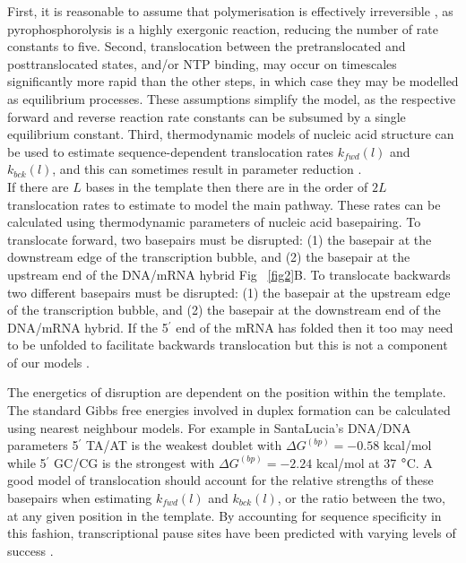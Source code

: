\documentclass[10pt,letterpaper]{article}
\begin{document}
First, it is reasonable to assume that polymerisation is effectively irreversible  \cite{erie1992single, rhodes1974ribonucleic, maoileidigh2011unified, bai2004sequence}, as pyrophosphorolysis is a highly exergonic reaction, reducing the number of rate constants to five. 
Second, translocation between the pretranslocated and posttranslocated states, and/or NTP binding, may occur on timescales significantly more rapid than the other steps, in which case they may be modelled as equilibrium processes. These assumptions simplify the model, as the respective forward and reverse reaction rate constants can be subsumed by a single equilibrium constant. Third, thermodynamic models of nucleic acid structure can be used to estimate sequence-dependent translocation rates $k_{fwd}(l)$ and $k_{bck}(l)$, and this can sometimes result in parameter reduction \cite{tadigotla2006thermodynamic, maoileidigh2011unified, bai2004sequence}. \\


If there are $L$ bases in the template then there are in the order of $2L$ translocation rates to estimate to model the main pathway. These rates can be calculated using thermodynamic parameters of nucleic acid basepairing. To translocate forward, two basepairs must be disrupted: (1) the basepair at the downstream edge of the transcription bubble, and (2) the basepair at the upstream end of the DNA/mRNA hybrid Fig ~\ref{fig2}B. To translocate backwards two different basepairs must be disrupted: (1) the basepair at the upstream edge of the transcription bubble, and (2) the basepair at the downstream end of the DNA/mRNA hybrid. If the 5$^\prime$ end of the mRNA has folded then it too may need to be unfolded to facilitate backwards translocation but this is not a component of our models \cite{tadigotla2006thermodynamic, maoileidigh2011unified}. \par

The energetics of disruption are dependent on the position within the template. The standard Gibbs free energies involved in duplex formation can be calculated using nearest neighbour models. For example in SantaLucia's DNA/DNA parameters \cite{santalucia1998unified} 5$^\prime$ TA/AT is the weakest doublet with $\Delta G^{(bp)} = -0.58$ kcal/mol while 5$^\prime$ GC/CG is the strongest with $\Delta G^{(bp)} = -2.24$ kcal/mol at 37 $\degree$C. A good model of translocation should account for the relative strengths of these basepairs when estimating $k_{fwd}(l)$ and $k_{bck}(l)$, or the ratio between the two, at any given position in the template. By accounting for sequence specificity in this fashion, transcriptional pause sites have been predicted with varying levels of success \cite{tadigotla2006thermodynamic, bai2004sequence, bai2007mechanochemical}. \\
\end{document}
